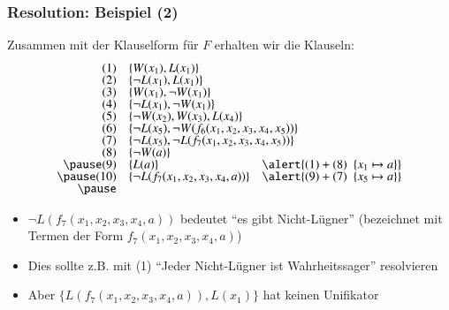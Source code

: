 \documentclass[aspectratio=1610,onlymath]{beamer}
\begin{document}
\begin{frame}[t]\frametitle{Resolution: Beispiel (2)}

Zusammen mit der Klauselform für $F$ erhalten wir die Klauseln:
%
{\small%
\[\begin{array}{rll}
(1) & \{W(x_1), L(x_1)\}\\[-0.5ex]
(2) & \{\neg L(x_1), L(x_1)\}\\[-0.5ex]
(3) & \{W(x_1), \neg W(x_1)\}\\[-0.5ex]
(4) & \{\neg L(x_1), \neg W(x_1)\}\\[-0.5ex]
(5) & \{\neg W(x_2), W(x_3), L(x_4)\}\\[-0.5ex]
(6) & \{\neg L(x_5),\ghost{$\neg W(f_6(x_1,x_2,x_3,x_4,x_5))\}$}\\[-0.5ex]
(7) & \{\neg L(x_5),\ghost{$\neg L(f_7(x_1,x_2,x_3,x_4,x_5))\}$} \\[-0.5ex]
(8) & \{\neg W(a)\}\\[-0.5ex]\pause
(9) & \{L(a)\} & \alert{(1)+(8)~~ \{x_1\mapsto a\}}\\[-0.5ex]\pause
(10) & \{\neg L(f_7(x_1,x_2,x_3,x_4,a))\} & \alert{(9)+(7)~~ \{x_5\mapsto a\}}\\[-0.5ex]\pause
\end{array}
\]}\vspace{-3.5ex}


\hspace{-2mm}%
\begin{minipage}[t]{8.5cm}\footnotesize\vspace{-2ex}
\begin{itemize}
\item $\neg L(f_7(x_1,x_2,x_3,x_4,a))$ bedeutet "`es gibt Nicht-Lügner"' (bezeichnet mit Termen der Form $f_7(x_1,x_2,x_3,x_4,a)$)\\[-2ex]
\item Dies sollte z.B. mit (1) "`Jeder Nicht-Lügner ist Wahrheitssager"' resolvieren\\[-2ex]
\item Aber $\{L(f_7(x_1,x_2,x_3,x_4,a)), L(x_1)\}$ hat keinen Unifikator
\end{itemize}
\end{minipage}

\end{frame}
\end{document}

